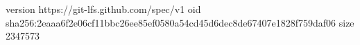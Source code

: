 version https://git-lfs.github.com/spec/v1
oid sha256:2eaaa6f2e06cf11bbc26ee85ef0580a54cd45d6dec8de67407e1828f759daf06
size 2347573

